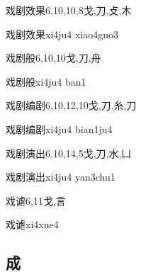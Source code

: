 \begin{Entry}{戏剧效果}{6,10,10,8}{⼽,⼑,⽁,⽊}
  \begin{Phonetics}{戏剧效果}{xi4ju4 xiao4guo3}
  \end{Phonetics}
\end{Entry}

\begin{Entry}{戏剧般}{6,10,10}{⼽,⼑,⾈}
  \begin{Phonetics}{戏剧般}{xi4ju4 ban1}
  \end{Phonetics}
\end{Entry}

\begin{Entry}{戏剧编剧}{6,10,12,10}{⼽,⼑,⽷,⼑}
  \begin{Phonetics}{戏剧编剧}{xi4ju4 bian1ju4}
  \end{Phonetics}
\end{Entry}

\begin{Entry}{戏剧演出}{6,10,14,5}{⼽,⼑,⽔,⼐}
  \begin{Phonetics}{戏剧演出}{xi4ju4 yan3chu1}
  \end{Phonetics}
\end{Entry}

\begin{Entry}{戏谑}{6,11}{⼽,⾔}
  \begin{Phonetics}{戏谑}{xi4xue4}
  \end{Phonetics}
\end{Entry}

\subsection*{成}

